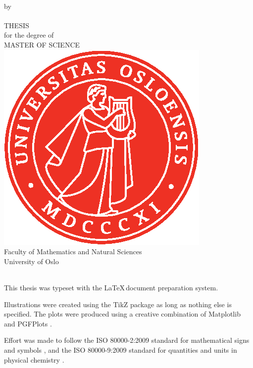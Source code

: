 \thispagestyle{empty}
\begin{center} \vspace{1cm}
    \textbf{\Large{\mtitle}}\\ \vspace{0.5cm}
    \small{by}\\ \vspace{0.5cm}
    \large{\mauthor}\\ \vspace{4.4cm}
    \large{THESIS}\\ \vspace{0.3cm}
    \small{for the degree of}\\ \vspace{0.3cm}
    \large{MASTER OF SCIENCE}\\ \vspace{0.7cm}
    \includegraphics[scale=1.0]{Images/UiO_Segl_pms485.eps} \\ \vspace{0.5cm}
    \large{Faculty of Mathematics and Natural Sciences \\ University of Oslo} \\ \vspace{0.5cm}
    \small{\mdate}\\ \vfill
\end{center}
\newpage
\vspace*{\fill}
{\setlength{\parindent}{0cm}
This thesis was typeset with the \LaTeX\,document preparation system.\bigskip

Illustrations were created using the TikZ package \cite{tantau_graph_2013} as long as nothing else is specified. The plots were produced using a creative combination of Matplotlib \cite{hunter_matplotlib:_2007} and PGFPlots \cite{tantau_graph_2013}.\bigskip

Effort was made to follow the ISO 80000-2:2009 standard for mathematical signs and symbols \cite{iso/tc_12_iso_nodate}, and the ISO 80000-9:2009 standard for quantities and units in physical chemistry \cite{iso/tc_12_iso_nodate-1}.
} 
\newpage
